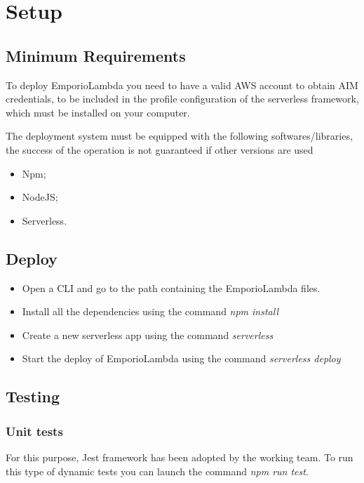 \section{Setup} \label{_setup}

\subsection{Minimum Requirements}
To deploy EmporioLambda you need to have a valid AWS account to obtain AIM credentials, to be included in the profile configuration of 
the serverless framework, which must be installed on your computer.

The deployment system must be equipped with the following softwares/libraries, the success of the operation is not guaranteed if other versions are used


\begin{itemize}
    \item Npm;
    \item NodeJS;
    \item Serverless.
\end{itemize}

\subsection{Deploy}

\begin{itemize}
    \item Open a CLI and go to the path containing the EmporioLambda files.
    \item Install all the dependencies using the command \textit{npm install}
    \item Create a new serverless app using the command \textit{serverless}
    \item Start the deploy of EmporioLambda using the command \textit{serverless deploy}
\end{itemize}

\subsection{Testing}

\subsubsection{Unit tests}
For this purpose, Jest framework has been adopted by the working team. To run this type of dynamic tests
you can launch the command \textit{npm run test}.

